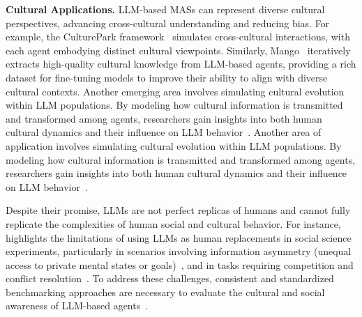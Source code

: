 \documentclass[acmsmall,nonacm]{acmart}
\begin{document}
        \textbf{Cultural Applications.} LLM-based MASs can represent diverse cultural perspectives, advancing cross-cultural understanding and reducing bias. For example, the CulturePark framework~\cite{li2024cultureparkboostingcrossculturalunderstanding} simulates cross-cultural interactions, with each agent embodying distinct cultural viewpoints. Similarly, Mango~\cite{10.1145/3627673.3679768} iteratively extracts high-quality cultural knowledge from LLM-based agents, providing a rich dataset for fine-tuning models to improve their ability to align with diverse cultural contexts. Another emerging area involves simulating cultural evolution within LLM populations. By modeling how cultural information is transmitted and transformed among agents, researchers gain insights into both human cultural dynamics and their influence on LLM behavior~\cite{tran2024irish,perez2024culturalevolutionpopulationslarge}. Another area of application involves simulating cultural evolution within LLM populations. By modeling how cultural information is transmitted and transformed among agents, researchers gain insights into both human cultural dynamics and their influence on LLM behavior~\cite{perez2024culturalevolutionpopulationslarge}.
        
        Despite their promise, LLMs are not perfect replicas of humans and cannot fully replicate the complexities of human social and cultural behavior. For instance,~\cite{DILLION2023597} highlights the limitations of using LLMs as human replacements in social science experiments, particularly in scenarios involving information asymmetry (unequal access to private mental states or goals)~\cite{zhou-etal-2024-real}, and in tasks requiring competition and conflict resolution~\cite{mou2024agentsensebenchmarkingsocialintelligence}. To address these challenges, consistent and standardized benchmarking approaches are necessary to evaluate the cultural and social awareness of LLM-based agents~\cite{qiu2024evaluatingculturalsocialawareness}.
\end{document}
